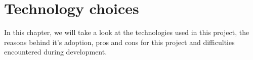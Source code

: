\chapter{Technology choices}

  In this chapter, we will take a look at the technologies used in this project,
  the reasons behind it's adoption, pros and cons for this project and
  difficulties encountered during development.

  
  
  
  
